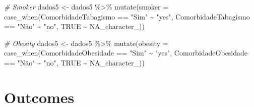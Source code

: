 \documentclass[
]{article}
\newenvironment{Shaded}{\begin{snugshade}}{\end{snugshade}}
\newcommand{\AttributeTok}[1]{\textcolor[rgb]{0.77,0.63,0.00}{#1}}
\newcommand{\CommentTok}[1]{\textcolor[rgb]{0.56,0.35,0.01}{\textit{#1}}}
\newcommand{\ConstantTok}[1]{\textcolor[rgb]{0.00,0.00,0.00}{#1}}
\newcommand{\FunctionTok}[1]{\textcolor[rgb]{0.00,0.00,0.00}{#1}}
\newcommand{\NormalTok}[1]{#1}
\newcommand{\OtherTok}[1]{\textcolor[rgb]{0.56,0.35,0.01}{#1}}
\newcommand{\SpecialCharTok}[1]{\textcolor[rgb]{0.00,0.00,0.00}{#1}}
\newcommand{\StringTok}[1]{\textcolor[rgb]{0.31,0.60,0.02}{#1}}
\begin{document}
\begin{Shaded}
\begin{Highlighting}[]
\CommentTok{\# Smoker}
\NormalTok{dados5 }\OtherTok{\textless{}{-}}\NormalTok{  dados5 }\SpecialCharTok{\%\textgreater{}\%}
  \FunctionTok{mutate}\NormalTok{(}\AttributeTok{smoker =} \FunctionTok{case\_when}\NormalTok{(ComorbidadeTabagismo }\SpecialCharTok{==} \StringTok{"Sim"} \SpecialCharTok{\textasciitilde{}} \StringTok{"yes"}\NormalTok{,}
\NormalTok{                              ComorbidadeTabagismo }\SpecialCharTok{==} \StringTok{"Não"} \SpecialCharTok{\textasciitilde{}} \StringTok{"no"}\NormalTok{,}
                              \ConstantTok{TRUE} \SpecialCharTok{\textasciitilde{}} \ConstantTok{NA\_character\_}\NormalTok{))}

\CommentTok{\# Obesity}
\NormalTok{dados5 }\OtherTok{\textless{}{-}}\NormalTok{  dados5 }\SpecialCharTok{\%\textgreater{}\%}
  \FunctionTok{mutate}\NormalTok{(}\AttributeTok{obesity =} \FunctionTok{case\_when}\NormalTok{(ComorbidadeObesidade }\SpecialCharTok{==} \StringTok{"Sim"} \SpecialCharTok{\textasciitilde{}} \StringTok{"yes"}\NormalTok{,}
\NormalTok{                              ComorbidadeObesidade }\SpecialCharTok{==} \StringTok{"Não"} \SpecialCharTok{\textasciitilde{}} \StringTok{"no"}\NormalTok{,}
                              \ConstantTok{TRUE} \SpecialCharTok{\textasciitilde{}} \ConstantTok{NA\_character\_}\NormalTok{))}
\end{Highlighting}
\end{Shaded}

\hypertarget{outcomes}{%
\section{Outcomes}\label{outcomes}}
\end{document}
